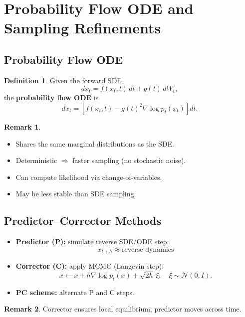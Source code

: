 \documentclass[12pt,oneside]{book}
\numberwithin{equation}{section}
\theoremstyle{definition}
\newtheorem{definition}{Definition}[section]
\newtheorem{remark}{Remark}[section]
\theoremstyle{plain}
\theoremstyle{remark}
\newcommand{\Normal}{\mathcal{N}}
\begin{document}
\section{Probability Flow ODE and Sampling Refinements}

\subsection{Probability Flow ODE}

\begin{definition}
Given the forward SDE
\[
dx_t = f(x_t,t)\,dt + g(t)\,dW_t,
\]
the \textbf{probability flow ODE} is
\[
dx_t = \left[f(x_t,t) - g(t)^2 \nabla \log p_t(x_t)\right] dt.
\]
\end{definition}

\begin{remark}
\begin{itemize}
    \item Shares the same marginal distributions as the SDE.
    \item Deterministic $\Rightarrow$ faster sampling (no stochastic noise).
    \item Can compute likelihood via change-of-variables.
    \item May be less stable than SDE sampling.
\end{itemize}
\end{remark}

\subsection{Predictor–Corrector Methods}

\begin{itemize}
    \item \textbf{Predictor (P):} simulate reverse SDE/ODE step:
    \[
    x_{t+h} \approx \text{reverse dynamics}
    \]
    
    \item \textbf{Corrector (C):} apply MCMC (Langevin step):
    \[
    x \leftarrow x + h \nabla \log p_t(x) + \sqrt{2h}\,\xi, \quad \xi \sim \Normal(0,I).
    \]
    
    \item \textbf{PC scheme:} alternate P and C steps.
\end{itemize}

\begin{remark}
Corrector ensures local equilibrium; predictor moves across time.
\end{remark}
\end{document}
